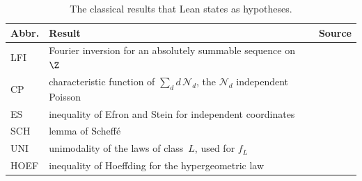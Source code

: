 \begin{table}[htbp]
\centering\small
\caption{The classical results that Lean states as hypotheses.}\label{tab:lean-inputs}
\begin{tabular}{@{}lll@{}}
\toprule
Abbr. & Result & Source\\
\midrule
LFI & Fourier inversion for an absolutely summable sequence on $\Z$ &
\cite[Chapter~I]{katznelson2004}\\
CP & characteristic function of $\sum_dd\,\mathcal N_d$, the $\mathcal N_d$ independent Poisson &
\cite[Section~3.3]{durrett2019}\\
ES & inequality of Efron and Stein for independent coordinates &
\cite{efronstein1981,steele1986}\\
SCH & lemma of Scheff\'e & \cite{scheffe1947}\\
UNI & unimodality of the laws of class~$L$, used for $f_L$ & \cite{yamazato1978}\\
HOEF & inequality of Hoeffding for the hypergeometric law & \cite[Section~6]{hoeffding1963}\\
\bottomrule
\end{tabular}
\end{table}
